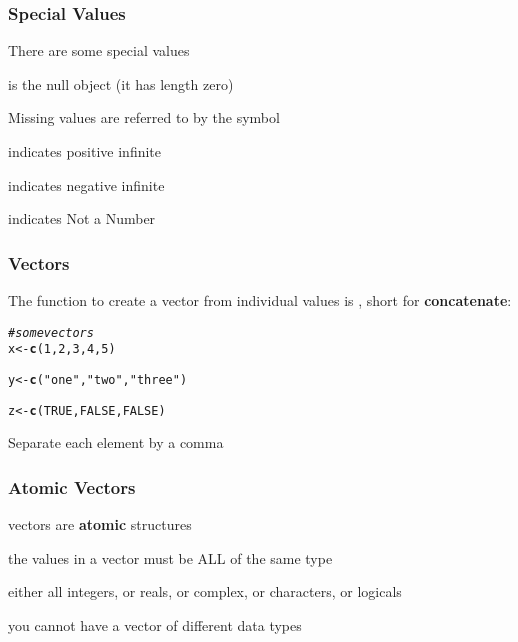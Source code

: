 \documentclass[12pt]{beamer}\usepackage[]{graphicx}\usepackage[]{color}
\makeatletter
\newcommand{\hlnum}[1]{\textcolor[rgb]{0.686,0.059,0.569}{#1}}%
\newcommand{\hlstr}[1]{\textcolor[rgb]{0.192,0.494,0.8}{#1}}%
\newcommand{\hlcom}[1]{\textcolor[rgb]{0.678,0.584,0.686}{\textit{#1}}}%
\newcommand{\hlstd}[1]{\textcolor[rgb]{0.345,0.345,0.345}{#1}}%
\newcommand{\hlkwb}[1]{\textcolor[rgb]{0.69,0.353,0.396}{#1}}%
\newcommand{\hlkwd}[1]{\textcolor[rgb]{0.737,0.353,0.396}{\textbf{#1}}}%
\newenvironment{kframe}{%
 \def\at@end@of@kframe{}%
 \ifinner\ifhmode%
  \def\at@end@of@kframe{\end{minipage}}%
  \begin{minipage}{\columnwidth}%
 \fi\fi%
 \def\FrameCommand##1{\hskip\@totalleftmargin \hskip-\fboxsep
 \colorbox{shadecolor}{##1}\hskip-\fboxsep
     \hskip-\linewidth \hskip-\@totalleftmargin \hskip\columnwidth}%
 \MakeFramed {\advance\hsize-\width
   \@totalleftmargin\z@ \linewidth\hsize
   \@setminipage}}%
 {\par\unskip\endMakeFramed%
 \at@end@of@kframe}
\newenvironment{knitrout}{}{} %
\makeatother
\begin{document}

\begin{frame}[fragile]
\frametitle{Special Values}

There are some special values 
\bi
  \item {} is the null object (it has length zero)
  \item Missing values are referred to by the symbol 
  \item {} indicates positive infinite
  \item {} indicates negative infinite
  \item {} indicates Not a Number
\ei

\end{frame}


\begin{frame}[fragile]
\frametitle{Vectors}

The function to create a vector from individual values is {\hilit {}}, short for \textbf{concatenate}:

\begin{knitrout}\footnotesize
{}\color{fgcolor}\begin{kframe}
\begin{alltt}
\hlcom{# some vectors}
\hlstd{x} \hlkwb{<-} \hlkwd{c}\hlstd{(}\hlnum{1}\hlstd{,} \hlnum{2}\hlstd{,} \hlnum{3}\hlstd{,} \hlnum{4}\hlstd{,} \hlnum{5}\hlstd{)}

\hlstd{y} \hlkwb{<-} \hlkwd{c}\hlstd{(}\hlstr{"one"}\hlstd{,} \hlstr{"two"}\hlstd{,} \hlstr{"three"}\hlstd{)}

\hlstd{z} \hlkwb{<-} \hlkwd{c}\hlstd{(}\hlnum{TRUE}\hlstd{,} \hlnum{FALSE}\hlstd{,} \hlnum{FALSE}\hlstd{)}
\end{alltt}
\end{kframe}
\end{knitrout}
Separate each element by a comma

\end{frame}


\begin{frame}
\frametitle{Atomic Vectors}

\bi
  \item vectors are \textbf{atomic} structures
  \item the values in a vector must be ALL of the same type 
  \item either all integers, or reals, or complex, or characters, or logicals
  \item you cannot have a vector of different data types
\ei

\end{frame}
\end{document}
